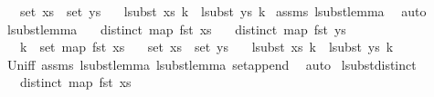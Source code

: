 \begin{isabellebody}
\ \ \ {\isachardoublequoteopen}set\ xs\ {\isacharequal}{\kern0pt}\ set\ ys{\isachardoublequoteclose}\isanewline
\ \ \ {\isachardoublequoteopen}lsubst\ xs\ k\ {\isacharequal}{\kern0pt}\ lsubst\ ys\ k{\isachardoublequoteclose}\isanewline
%
\isadelimproof
%
\endisadelimproof
%
\isatagproof
{}\isamarkupfalse%
\ assms{\isacharparenleft}{\kern0pt}{}{\isacharcomma}{\kern0pt}{}{\isacharcomma}{\kern0pt}{}{\isacharcomma}{\kern0pt}{}{\isacharparenright}{\kern0pt}\ lsubst{\isacharunderscore}{\kern0pt}lemma{}\ \isamarkupfalse%
\ auto%
\endisatagproof
{\isafoldproof}%
%
\isadelimproof
\isanewline
%
\endisadelimproof
\isanewline
\isanewline
\isanewline
{}\isamarkupfalse%
\ lsubst{\isacharunderscore}{\kern0pt}lemma{}{\isacharcolon}{\kern0pt}\isanewline
\ \ \ {\isachardoublequoteopen}distinct\ {\isacharparenleft}{\kern0pt}map\ fst\ xs{\isacharparenright}{\kern0pt}{\isachardoublequoteclose}\isanewline
\ \ \ {\isachardoublequoteopen}distinct\ {\isacharparenleft}{\kern0pt}map\ fst\ ys{\isacharparenright}{\kern0pt}{\isachardoublequoteclose}\isanewline
\ \ \ {\isachardoublequoteopen}k\ {\isasymin}\ set\ {\isacharparenleft}{\kern0pt}map\ fst\ xs{\isacharparenright}{\kern0pt}{\isachardoublequoteclose}\isanewline
\ \ \ {\isachardoublequoteopen}set\ xs\ {\isasymsubseteq}\ set\ ys{\isachardoublequoteclose}\isanewline
\ \ \ {\isachardoublequoteopen}lsubst\ xs\ k\ {\isacharequal}{\kern0pt}\ lsubst\ ys\ k{\isachardoublequoteclose}\isanewline
%
\isadelimproof
%
\endisadelimproof
%
\isatagproof
{}\isamarkupfalse%
\ Un{\isacharunderscore}{\kern0pt}iff\ assms{\isacharparenleft}{\kern0pt}{}{\isacharcomma}{\kern0pt}{}{\isacharcomma}{\kern0pt}{}{\isacharcomma}{\kern0pt}{}{\isacharparenright}{\kern0pt}\ lsubst{\isacharunderscore}{\kern0pt}lemma{}\ lsubst{\isacharunderscore}{\kern0pt}lemma{}\ set{\isacharunderscore}{\kern0pt}append\ \isamarkupfalse%
\ auto%
\endisatagproof
{\isafoldproof}%
%
\isadelimproof
\isanewline
%
\endisadelimproof
\isanewline
\isanewline
\isanewline
{}\isamarkupfalse%
\ lsubst{\isacharunderscore}{\kern0pt}distinct{\isacharcolon}{\kern0pt}\isanewline
\ \ \ {\isachardoublequoteopen}distinct\ {\isacharparenleft}{\kern0pt}map\ fst\ xs{\isacharparenright}{\kern0pt}{\isachardoublequoteclose}\isanewline

\end{isabellebody}
